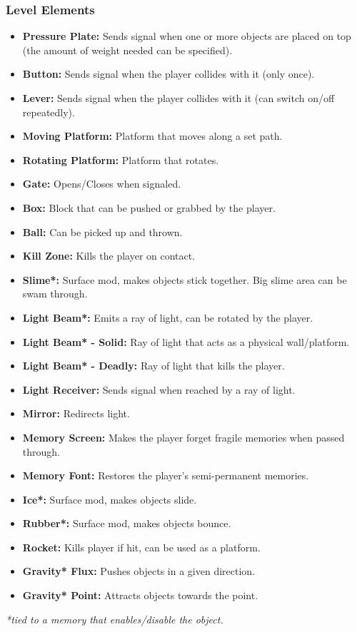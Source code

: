 \documentclass{article}
\begin{document}
\subsubsection{Level Elements}
\begin{itemize}
    \item \textbf{Pressure Plate:} Sends signal when one or more objects are placed on top (the amount of weight needed can be specified).
    \item \textbf{Button:} Sends signal when the player collides with it (only once).
    \item \textbf{Lever:} Sends signal when the player collides with it (can switch on/off repeatedly).
    \item \textbf{Moving Platform:} Platform that moves along a set path.
    \item \textbf{Rotating Platform:} Platform that rotates.
    \item \textbf{Gate:} Opens/Closes when signaled.
    \item \textbf{Box:} Block that can be pushed or grabbed by the player.
    \item \textbf{Ball:} Can be picked up and thrown.
    \item \textbf{Kill Zone:} Kills the player on contact.
    \item \textbf{Slime*:} Surface mod, makes objects stick together. Big slime area can be swam through.
    \item \textbf{Light Beam*:} Emits a ray of light, can be rotated by the player.
    \item \textbf{Light Beam* - Solid:} Ray of light that acts as a physical wall/platform.
    \item \textbf{Light Beam* - Deadly:} Ray of light that kills the player.
    \item \textbf{Light Receiver:} Sends signal when reached by a ray of light.
    \item \textbf{Mirror:} Redirects light.
    \item \textbf{Memory Screen:} Makes the player forget fragile memories when passed through.
    \item \textbf{Memory Font:} Restores the player's semi-permanent memories.
    \item \textbf{Ice*:} Surface mod, makes objects slide.
    \item \textbf{Rubber*:} Surface mod, makes objects bounce.
    \item \textbf{Rocket:} Kills player if hit, can be used as a platform.
    \item \textbf{Gravity* Flux:} Pushes objects in a given direction.
    \item \textbf{Gravity* Point:} Attracts objects towards the point.
\end{itemize}
\textit{*tied to a memory that enables/disable the object.}
\end{document}
